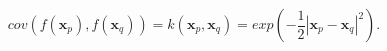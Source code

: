 \begin{equation}
\label{eq:covariancefunctionse}
cov(f(\mathbf{x}_p), f(\mathbf{x}_q)) = k(\mathbf{x}_p, \mathbf{x}_q) =
exp \left(-\frac{1}{2} |\mathbf{x}_p - \mathbf{x}_q|^2 \right) .
\end{equation}